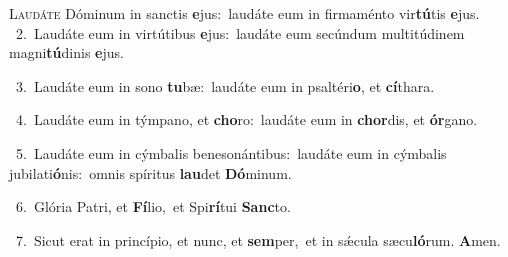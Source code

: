 \lettrine{\initial\textcolor{\initialcolor}{L}}{audáte} Dóminum in sanctis \textbf{e}\-jus:~\star laudáte eum in firmaménto vir\-\textbf{tú}\-tis \textbf{e}\-jus.\\
{\numbfont\textcolor{\numbcolor}{~2.}}~Laudáte eum in virtútibus \textbf{e}\-jus:~\star laudáte eum secúndum multitúdinem magni\-\textbf{tú}\-dinis \textbf{e}\-jus.\par
{\numbfont\textcolor{\numbcolor}{~3.}}~Laudáte eum in sono \textbf{tu}\-bæ:~\star laudáte eum in psaltéri\-\textbf{o}\-, et \textbf{cí}\-thara.\par
{\numbfont\textcolor{\numbcolor}{~4.}}~Laudáte eum in týmpano, et \textbf{cho}\-ro:~\star laudáte eum in \textbf{chor}\-dis, et \textbf{ór}\-gano.\par
{\numbfont\textcolor{\numbcolor}{~5.}}~Laudáte eum in cýmbalis benesonántibus:~\dagger laudáte eum in cýmbalis jubilati\-\textbf{ó}\-nis:~\star omnis spíritus \textbf{lau}\-det \textbf{Dó}\-minum.\par
{\numbfont\textcolor{\numbcolor}{~6.}}~Glória Patri, et \textbf{Fí}\-lio,~\star et Spi\-\textbf{rí}\-tui \textbf{Sanc}\-to.\par
{\numbfont\textcolor{\numbcolor}{~7.}}~Sicut erat in princípio, et nunc, et \textbf{sem}\-per,~\star et in sǽcula sæcu\-\textbf{ló}\-rum. \textbf{A}\-men.\par
